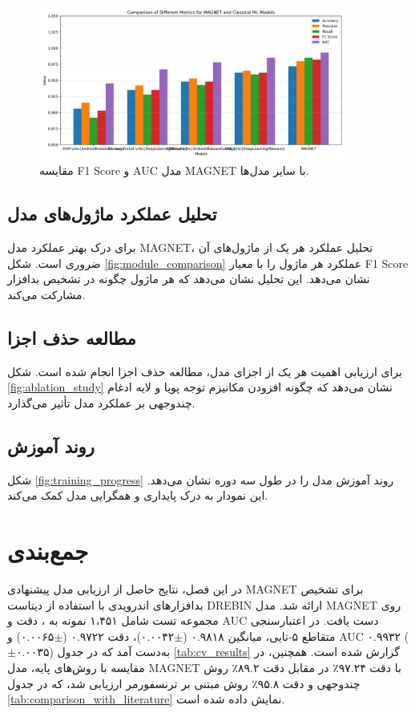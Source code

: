 \begin{figure}[h!]
    \centering
    \includegraphics[width=0.9\textwidth]{images/fig_baseline_metrics_comparison}
    \caption{مقایسه F1 Score و AUC مدل MAGNET با سایر مدل‌ها.}
    \label{fig:baseline_comparison}
\end{figure}

\subsection{تحلیل عملکرد ماژول‌های مدل}
برای درک بهتر عملکرد مدل MAGNET، تحلیل عملکرد هر یک از ماژول‌های آن ضروری است. شکل \ref{fig:module_comparison} عملکرد هر ماژول را با معیار F1 Score نشان می‌دهد. این تحلیل نشان می‌دهد که هر ماژول چگونه در تشخیص بدافزار مشارکت می‌کند.

\subsection{مطالعه حذف اجزا}
برای ارزیابی اهمیت هر یک از اجزای مدل، مطالعه حذف اجزا انجام شده است. شکل \ref{fig:ablation_study} نشان می‌دهد که چگونه افزودن مکانیزم توجه پویا و لایه ادغام چندوجهی بر عملکرد مدل تأثیر می‌گذارد.

\subsection{روند آموزش}
شکل \ref{fig:training_progress} روند آموزش مدل را در طول سه دوره نشان می‌دهد. این نمودار به درک پایداری و همگرایی مدل کمک می‌کند.

\section{جمع‌بندی}
در این فصل، نتایج حاصل از ارزیابی مدل پیشنهادی MAGNET برای تشخیص بدافزارهای اندرویدی با استفاده از دیتاست DREBIN \cite{Drebin} ارائه شد. مدل MAGNET روی مجموعه تست شامل ۱،۴۵۱ نمونه به  ، دقت  و AUC  دست یافت. در اعتبارسنجی متقاطع ۵-تایی، میانگین  ۰.۹۸۱۸ ($\pm$۰.۰۰۴۲)، دقت ۰.۹۷۲۲ ($\pm$۰.۰۰۶۵) و AUC ۰.۹۹۳۲ ($\pm$۰.۰۰۳۵) به‌دست آمد که در جدول \ref{tab:cv_results} گزارش شده است. همچنین، در مقایسه با روش‌های پایه، مدل MAGNET با دقت ۹۷.۲۴٪ در مقابل دقت ۸۹.۲٪ روش چندوجهی \cite{Alsaleh2023} و دقت ۹۵.۸٪ روش مبتنی بر ترنسفورمر \cite{TransformerMalware} ارزیابی شد، که در جدول \ref{tab:comparison_with_literature} نمایش داده شده است.

